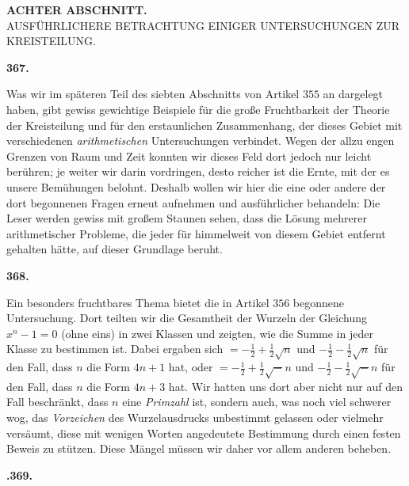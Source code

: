 \clearpage{}
\renewcommand{\BookRunningTitle}{Achter Abschnitt.}
\begin{center}
\textbf{ACHTER ABSCHNITT.}\\[1em]
AUSFÜHRLICHERE BETRACHTUNG EINIGER UNTERSUCHUNGEN ZUR KREISTEILUNG.
\end{center}
\par\medskip{}\centerline{\textbf{367.}}\nobreak\smallskip
Was wir im späteren Teil des siebten Abschnitts von Artikel $355$ an dargelegt haben, gibt gewiss gewichtige Beispiele für die große Fruchtbarkeit der Theorie der Kreisteilung und für den erstaunlichen Zusammenhang, der dieses Gebiet mit verschiedenen \textit{arithmetischen} Untersuchungen verbindet. Wegen der allzu engen Grenzen von Raum und Zeit konnten wir dieses Feld dort jedoch nur leicht berühren; je weiter wir darin vordringen, desto reicher ist die Ernte, mit der es unsere Bemühungen belohnt. Deshalb wollen wir hier die eine oder andere der dort begonnenen Fragen erneut aufnehmen und ausführlicher behandeln: Die Leser werden gewiss mit großem Staunen sehen, dass die Lösung mehrerer arithmetischer Probleme, die jeder für himmelweit von diesem Gebiet entfernt gehalten hätte, auf dieser Grundlage beruht.
\par\medskip{}\centerline{\textbf{368.}}\nobreak\smallskip
Ein besonders fruchtbares Thema bietet die in Artikel $356$ begonnene Untersuchung. Dort teilten wir die Gesamtheit der Wurzeln der Gleichung $x^n-1=0$ (ohne eins) in zwei Klassen und zeigten, wie die Summe in jeder Klasse zu bestimmen ist. Dabei ergaben sich $=-\frac12+\frac12\surd n$ und $-\frac12-\frac12\surd n$ für den Fall, dass $n$ die Form $4n+1$ hat, oder $=-\frac12+\frac12\surd -n$ und $-\frac12-\frac12\surd -n$ für den Fall, dass $n$ die Form $4n+3$ hat. Wir hatten uns dort aber nicht nur auf den Fall beschränkt, dass $n$ eine \textit{Primzahl} ist, sondern auch, was noch viel schwerer wog, das \textit{Vorzeichen} des Wurzelausdrucks unbestimmt gelassen oder vielmehr versäumt, diese mit wenigen Worten angedeutete Bestimmung durch einen festen Beweis zu stützen. Diese Mängel müssen wir daher vor allem anderen beheben.
\par\medskip{}\centerline{\textbf{.369.}}\nobreak\smallskip
